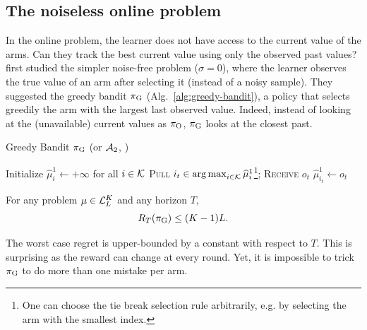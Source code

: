 \subsection{The noiseless online problem \citep{heidari2016tight}}
\label{ss:rested-noiseless-online}
In the online problem, the learner does not have access to the current value of the arms. Can they track the best current value using only the observed past values?  \citet{heidari2016tight} first studied the simpler noise-free problem ($\sigma =0$), where the learner observes the true value of an arm after selecting it (instead of a noisy sample). They suggested the greedy bandit $\pi_{\rm G}$ (Alg.~\ref{alg:greedy-bandit}), a policy that selects greedily the arm with the largest last observed value. Indeed, instead of looking at the (unavailable) current values as $\pi_{\rm O}$, $\pi_{\rm G}$ looks at the closest past. 

\begin{minipage}{\textwidth}
\renewcommand*\footnoterule{}
\begin{savenotes}
\begin{algorithm}[H]
\caption{Greedy Bandit $\pi_{\rm G}$ (or $\mathcal{A}_{\rm 2}$, \citet{heidari2016tight})}
\label{alg:greedy-bandit}
\begin{algorithmic}[1]
\Require
\State Initialize $\hat{\mu}_{i}^1 \leftarrow + \infty$ for all $i \in \mathcal{K}$
		\State \textsc{Pull} $i_t \in \operatorname*{arg\,max}_{i \in \mathcal{K}} \widehat{\mu}_{i}^1$\footnote{One can choose the tie break selection rule arbitrarily, e.g. by selecting the arm with the smallest index.}; \textsc{Receive} $o_{t}$
		\State $\hat{\mu}_{i_t}^1 \leftarrow o_{t}$
	\EndFor
\end{algorithmic}
\end{algorithm}
\end{savenotes}
\end{minipage}


\begin{proposition}
\label{prop:GB-ub}
For any problem $\mu \in \mathcal{L}_L^K$ and any horizon $T$, 
\[R_T (\pi_{\rm G}) \leq (K-1)L. \]
\end{proposition}
The worst case regret is upper-bounded by a constant with respect to $T$. This is surprising as the reward can change at every round. Yet, it is impossible to trick $\pi_{\rm G}$ to do more than one mistake per arm. 

